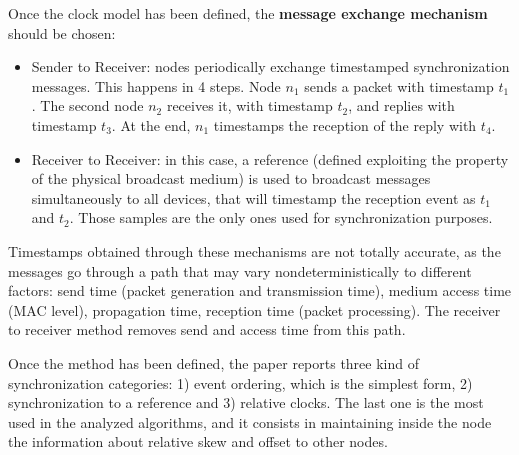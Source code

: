 Once the clock model has been defined, the \textbf{message exchange mechanism} should be chosen:
\begin{itemize}
    \item Sender to Receiver: nodes periodically exchange timestamped synchronization messages. This happens in 4 steps. Node \(n_1\) sends a packet with timestamp \(t_1\). The second node \(n_2\) receives it, with timestamp \(t_2\), and replies with timestamp \(t_3\). At the end, \(n_1\) timestamps the reception of the reply with \(t_4\).
    \item Receiver to Receiver: in this case, a reference (defined exploiting the property of the physical broadcast medium) is used to broadcast messages simultaneously to all devices, that will timestamp the reception event as \(t_1\) and \(t_2\). Those samples are the only ones used for synchronization purposes. 
\end{itemize}

Timestamps obtained through these mechanisms are not totally accurate, as the messages go through a path that may vary nondeterministically to different factors: send time (packet generation and transmission time), medium access time (MAC level), propagation time, reception time (packet processing). The receiver to receiver method removes send and access time from this path.

Once the method has been defined, the paper reports three kind of synchronization categories: 1) event ordering, which is the simplest form, 2) synchronization to a reference and 3) relative clocks. The last one is the most used in the analyzed algorithms, and it consists in maintaining inside the node the information about relative skew and offset to other nodes. 

